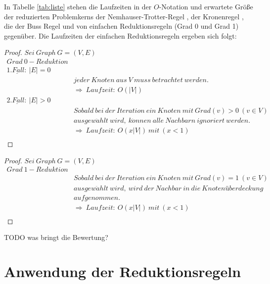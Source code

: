 In Tabelle \ref{tab:liste} stehen die Laufzeiten in der $O$-Notation und erwartete Größe der reduzierten Problemkerns der Nemhauser-Trotter-Regel \cite[S67]{fixed}, der Kronenregel \cite[S71]{fixed} \cite{manual}, die der Buss Regel \cite[S67]{fixed} und von einfachen Reduktionsregeln (Grad 0 und Grad 1) gegenüber. Die Laufzeiten der einfachen Reduktionsregeln ergeben sich folgt:
\begin{proof}
 $Sei\ Graph\ G = (V,E)$
	\begin{align*}
  		Grad\ 0-Reduktion\\
  		\underline{1.Fall:}\ |E|=0&\\
  		&jeder\ Knoten\ aus\ V\ muss\ betrachtet\ werden.\\
  		&\Rightarrow\ Laufzeit:\ O(|V|)\\  		
  		\underline{2.Fall:}\ |E|>0&\\
  		&Sobald\ bei\ der\ Iteration\ ein\ Knoten\ mit\ Grad(v)>0\ (v\in V)\ \\
  		&ausgew\ddot{a}hlt\ wird,\ k\ddot{o}nnen\ alle\ Nachbarn\ ignoriert\ werden.\\
  		&\Rightarrow\ Laufzeit:\ O(x|V|)\ mit\ (x<1)\\
	\end{align*}
\end{proof}
\begin{proof}
$Sei\ Graph\ G = (V,E)$
	\begin{align*}
  		Grad\ 1-Reduktion\\
  		&Sobald\ bei\ der\ Iteration\ ein\ Knoten\ mit\ Grad(v)=1\ (v\in V)\ \\
  		&ausgew\ddot{a}hlt\ wird,\ wird\ der\ Nachbar\ in\ die\ Knotenüberdeckung\\
  		&aufgenommen.\\
  		&\Rightarrow\ Laufzeit:\ O(x|V|)\ mit\ (x<1)\\
	\end{align*}
\end{proof}

TODO was bringt die Bewertung?

\section{Anwendung der Reduktionsregeln}
\label{ch:Analyse:sec:Anwendung}

